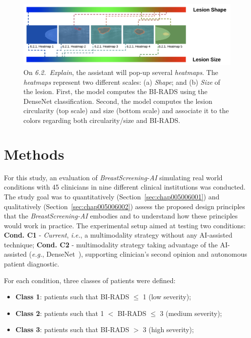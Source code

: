 \begin{figure}[htbp]
\centering
\includegraphics[width=\columnwidth]{images/fig032}
\caption{On {\it 6.2.~Explain}, the assistant will pop-up several {\it heatmaps}. The {\it heatmaps} represent two different scales: (a) {\it Shape}; and (b) {\it Size} of the lesion. First, the model computes the BI-RADS using the DenseNet classification. Second, the model computes the lesion circularity (top scale) and size (bottom scale) and associate it to the colors regarding both circularity/size and BI-RADS.}
\label{fig:fig032}
\end{figure}

\section{Methods}
\label{sec:chap005005}

For this study, an evaluation of {\it BreastScreening-AI} simulating real world conditions with 45 clinicians in nine different clinical institutions was conducted.
The study goal was to quantitatively (Section~\ref{sec:chap005006001}) and qualitatively (Section~\ref{sec:chap005006002}) assess the proposed design principles that the {\it BreastScreening-AI} embodies and to understand how these principles would work in practice.
The experimental setup aimed at testing two conditions: {\bf Cond. C1} - {\it Current}, {\it i.e.}, a multimodality strategy without any \ac{AI}-assisted technique; {\bf Cond. C2} - multimodality strategy taking advantage of the  \ac{AI}-assisted ({\it e.g.}, DenseNet~\cite{9098470}), supporting clinician's second opinion and autonomous patient diagnostic.

\hfill

\noindent
For each condition, three classes of patients were defined:

\begin{itemize}
\item {\bf Class 1}: patients such that \ac{BI-RADS} $\leq$ 1 (low severity);
\item {\bf Class 2}: patients such that 1 $<$ \ac{BI-RADS} $\leq$ 3 (medium severity);
\item {\bf Class 3}: patients such that \ac{BI-RADS} $>$ 3 (high severity);
\end{itemize}

